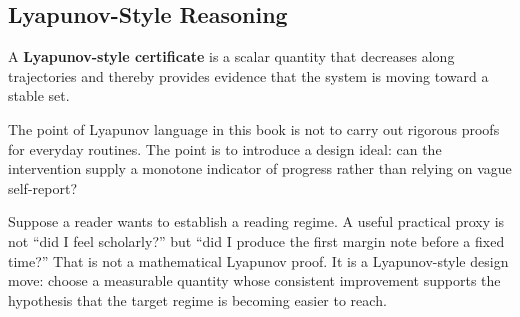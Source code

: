 \subsection{Lyapunov-Style Reasoning}

\begin{definition}
A \textbf{Lyapunov-style certificate} is a scalar quantity that decreases along
trajectories and thereby provides evidence that the system is moving toward a
stable set.
\end{definition}

The point of Lyapunov language in this book is not to carry out rigorous proofs
for everyday routines. The point is to introduce a design ideal: can the
intervention supply a monotone indicator of progress rather than relying on
vague self-report?

\begin{example}
Suppose a reader wants to establish a reading regime. A useful practical proxy
is not ``did I feel scholarly?'' but ``did I produce the first margin note
before a fixed time?'' That is not a mathematical Lyapunov proof. It is a
Lyapunov-style design move: choose a measurable quantity whose consistent
improvement supports the hypothesis that the target regime is becoming easier to
reach.
\end{example}
